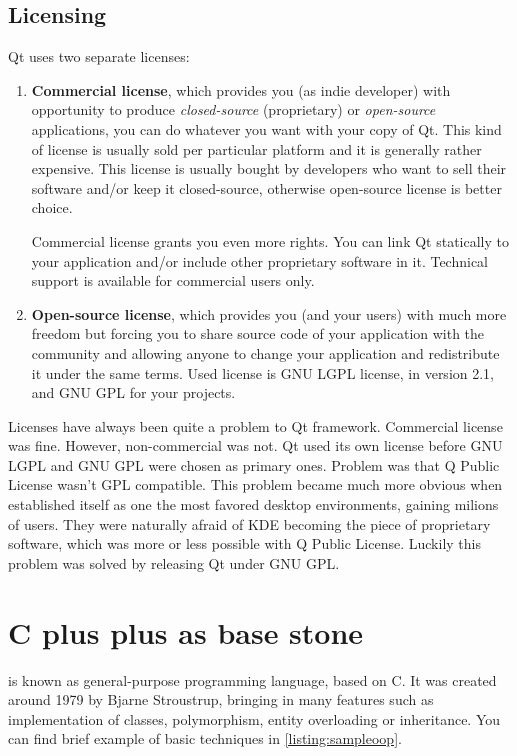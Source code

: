 \subsection{Licensing}
Qt uses two separate licenses:
\begin{enumerate}
\item \textbf{Commercial license}, which provides you (as indie developer) with opportunity to produce \textit{closed-source} (proprietary) or \textit{open-source} applications, you can do whatever you want with your copy of Qt. This kind of license is usually sold per particular platform and it is generally rather expensive. This license is usually bought by developers who want to sell their software and/or keep it closed-source, otherwise open-source license is better choice.

Commercial license grants you even more rights. You can link Qt statically to your application and/or include other proprietary software in it. Technical support is available for commercial users only.

\item \textbf{Open-source license}, which provides you (and your users) with much more freedom but forcing you to share source code of your application with the community and allowing anyone to change your application and redistribute it under the same terms. Used license is GNU LGPL license, in version 2.1, and GNU GPL \citep{stallman:gnugpl} for your projects.
\end{enumerate}

Licenses have always been quite a problem to Qt framework. Commercial license was fine. However, non-commercial was not. Qt used its own license before GNU LGPL and GNU GPL were chosen as primary ones. Problem was that Q Public License wasn't GPL compatible. This problem became much more obvious when  established itself as one the most favored desktop environments, gaining milions of users. They were naturally afraid of KDE becoming the piece of proprietary software, which was more or less possible with Q Public License. Luckily this problem was solved by releasing Qt under GNU GPL.

\section{C plus plus as base stone}\label{subsection:cpp}
\cpp{} is known as general-purpose programming language, based on C. It was created around 1979 by Bjarne Stroustrup, bringing in many  features such as implementation of classes, polymorphism, entity overloading or inheritance. You can find brief example of basic techniques in \autoref{listing:sampleoop}.


